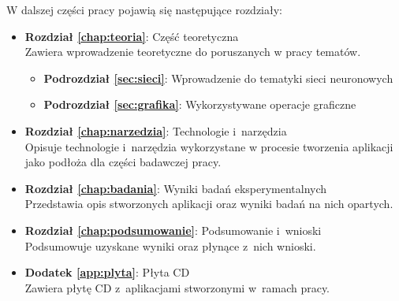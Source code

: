 W dalszej części pracy pojawią się następujące rozdziały:
\begin {itemize}
\item \textbf{Rozdział \ref{chap:teoria}}: Część teoretyczna\\
Zawiera wprowadzenie teoretyczne do poruszanych w pracy tematów.
\begin {itemize}
\item \textbf{Podrozdział \ref{sec:sieci}}: Wprowadzenie do tematyki sieci neuronowych
\item \textbf{Podrozdział \ref{sec:grafika}}: Wykorzystywane operacje graficzne
\end{itemize}
\item \textbf{Rozdział \ref{chap:narzedzia}}: Technologie i~narzędzia\\
Opisuje technologie i~narzędzia wykorzystane w procesie tworzenia aplikacji jako podłoża dla części badawczej pracy.
\item \textbf{Rozdział \ref{chap:badania}}: Wyniki badań eksperymentalnych\\
Przedstawia opis stworzonych aplikacji oraz wyniki badań na nich opartych.
\item \textbf{Rozdział \ref{chap:podsumowanie}}: Podsumowanie i~wnioski\\
Podsumowuje uzyskane wyniki oraz płynące z~nich wnioski.
\item \textbf{Dodatek \ref{app:plyta}}: Płyta CD\\
Zawiera płytę CD z~aplikacjami stworzonymi w~ramach pracy.
\end{itemize}
\fi
